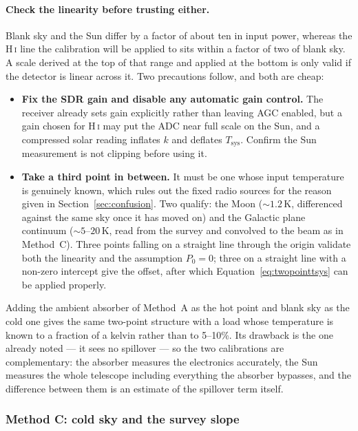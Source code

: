 \documentclass[11pt,a4paper]{article}
\begin{document}
\paragraph{Check the linearity before trusting either.} Blank sky and the Sun differ by a factor of about ten in input power, whereas the H\,\textsc{i} line the calibration will be applied to sits within a factor of two of blank sky. A scale derived at the top of that range and applied at the bottom is only valid if the detector is linear across it. Two precautions follow, and both are cheap:

\begin{itemize}
    \item \textbf{Fix the SDR gain and disable any automatic gain control.} The receiver already sets gain explicitly rather than leaving AGC enabled, but a gain chosen for H\,\textsc{i} may put the ADC near full scale on the Sun, and a compressed solar reading inflates $k$ and deflates $T_\text{sys}$. Confirm the Sun measurement is not clipping before using it.
    \item \textbf{Take a third point in between.} It must be one whose input temperature is genuinely known, which rules out the fixed radio sources for the reason given in Section~\ref{sec:confusion}. Two qualify: the Moon ($\sim1.2$\,K, differenced against the same sky once it has moved on) and the Galactic plane continuum ($\sim5$--$20$\,K, read from the survey and convolved to the beam as in Method~C). Three points falling on a straight line through the origin validate both the linearity and the assumption $P_0 = 0$; three on a straight line with a non-zero intercept give the offset, after which Equation~\eqref{eq:twopointtsys} can be applied properly.
\end{itemize}

Adding the ambient absorber of Method~A as the hot point and blank sky as the cold one gives the same two-point structure with a load whose temperature is known to a fraction of a kelvin rather than to 5--10\%. Its drawback is the one already noted --- it sees no spillover --- so the two calibrations are complementary: the absorber measures the electronics accurately, the Sun measures the whole telescope including everything the absorber bypasses, and the difference between them is an estimate of the spillover term itself.

\subsubsection{Method C: cold sky and the survey slope}
\end{document}
